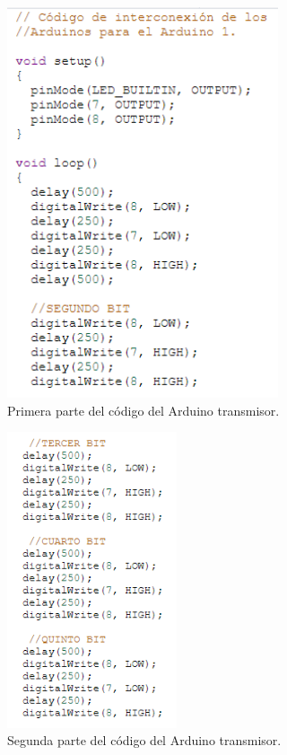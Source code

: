 \documentclass{article}
\begin{document}
\begin{figure}[h]
\includegraphics[width=8cm]{codigo_arduino1_1.PNG}
\centering
\caption{Primera parte del código del Arduino transmisor.}
\label{fig:codigo_arduino1_1.PNG}
\end{figure}

\newpage

\begin{figure}[h]
\includegraphics[width=5cm]{codigo_arduino1_2.PNG}
\centering
\caption{Segunda parte del código del Arduino transmisor.}
\label{fig:codigo_arduino1_2.PNG}
\end{figure}

\newpage
\end{document}
